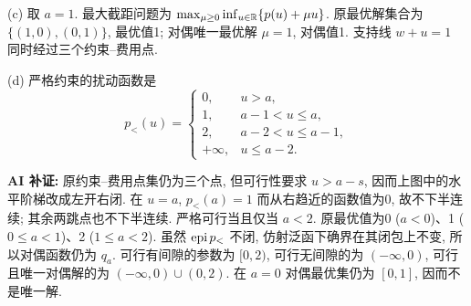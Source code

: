 \begin{solution}
(c) 取 $a=1$. 最大截距问题为
$\max_{\mu\ge0}\inf_{u\in\mathbb R}\{p(u)+\mu u\}$.
原最优解集合为 $\{(1,0),(0,1)\}$, 最优值1; 对偶唯一最优解 $\mu=1$, 对偶值1. 支持线 $w+u=1$ 同时经过三个约束--费用点.

(d) 严格约束的扰动函数是
\[
p_{<}(u)=\begin{cases}
0,&u>a,\\1,&a-1<u\le a,\\2,&a-2<u\le a-1,\\+\infty,&u\le a-2.
\end{cases}
\]
\begin{center}
\end{center}
\textbf{AI 补证:} 原约束--费用点集仍为三个点, 但可行性要求 $u>a-s$, 因而上图中的水平阶梯改成左开右闭. 在 $u=a$, $p_{<}(a)=1$ 而从右趋近的函数值为0, 故不下半连续; 其余两跳点也不下半连续.
严格可行当且仅当 $a<2$. 原最优值为0 ($a<0$)、1 ($0\le a<1$)、2 ($1\le a<2$). 虽然 $\operatorname{epi} p_{<}$ 不闭, 仿射泛函下确界在其闭包上不变, 所以对偶函数仍为 $q_a$. 可行有间隙的参数为 $[0,2)$, 可行无间隙的为 $(-\infty,0)$, 可行且唯一对偶解的为 $(-\infty,0)\cup(0,2)$. 在 $a=0$ 对偶最优集仍为 $[0,1]$, 因而不是唯一解.
\end{solution}
